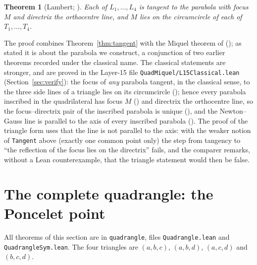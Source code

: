 \documentclass[11pt]{article}
\newtheorem{theorem}{Theorem}
\theoremstyle{definition}
\theoremstyle{remark}
\newcommand{\lean}[1]{\texttt{#1}}
\begin{document}
\begin{theorem}[Lambert; ]\label{thm:lambert}
Each of $L_1,\dots,L_4$ is tangent to the parabola with focus $M$ and directrix the orthocentre line,
and $M$ lies on the circumcircle of each of $T_1,\dots,T_4$.
\end{theorem}
The proof combines Theorem~\ref{thm:tangent} with the Miquel theorem of \cite{paperE}
(); as stated it is about the parabola we construct, a conjunction of two
earlier theorems recorded under the classical name. The classical statements are stronger, and are
proved in the Layer-15 file \lean{QuadMiquel/L15Classical.lean} (Section~\ref{sec:verify}):
the focus of \emph{any} parabola tangent, in the classical sense, to the three side lines of a triangle
lies on its circumcircle (); hence every parabola inscribed in the
quadrilateral has focus $M$ () and directrix the orthocentre line, so the
focus--directrix pair of the inscribed parabola is unique (), and the
Newton--Gauss line is parallel to the axis of every inscribed parabola ().
The proof of the triangle form uses that the line is not parallel to the axis: with the weaker notion of
\lean{Tangent} above (exactly one common point only) the step from tangency to ``the reflection of the
focus lies on the directrix'' fails, and the comparer remarks, without a Lean counterexample, that the
triangle statement would then be false.

\section{The complete quadrangle: the Poncelet point}\label{sec:quadrangle}

All theorems of this section are in \lean{quadrangle}, files \lean{Quadrangle.lean} and
\lean{QuadrangleSym.lean}. The four triangles are $(a,b,c)$, $(a,b,d)$, $(a,c,d)$ and $(b,c,d)$.
\end{document}

